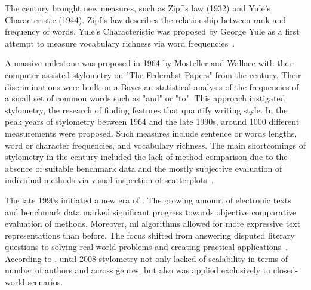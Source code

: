 
The  century brought new measures, such as Zipf's law (1932) and Yule's Characteristic (1944).
Zipf's law describes the relationship between rank and frequency of words.
Yule's Characteristic was proposed by George Yule as a first attempt to measure vocabulary richness via word frequencies~\citep{neal_surveying_2018,stamatatos_survey_2009}.

A massive milestone was proposed in 1964 by Mosteller and Wallace with their computer-assisted stylometry on "The Federalist Papers" from the  century.
Their discriminations were built on a Bayesian statistical analysis of the frequencies of a small set of common words such as "and" or "to".
This approach instigated stylometry, the research of finding features that quantify writing style.
In the peak years of stylometry between 1964 and the late 1990s, around \num{1000} different measurements were proposed.
Such measures include sentence or words lengths, word or character frequencies, and vocabulary richness.
The main shortcomings of stylometry in the  century included the lack of method comparison due to the absence of suitable benchmark data and the mostly subjective evaluation of individual methods via visual inspection of scatterplots~\citep{stamatatos_survey_2009}.

The late 1990s initiated a new era of \ai{}.
The growing amount of electronic texts and benchmark data marked significant progress towards objective comparative evaluation of methods.
Moreover, \ac{ml} algorithms allowed for more expressive text representations than before. 
The focus shifted from answering disputed literary questions to solving real-world problems and creating practical applications~\citep{stamatatos_survey_2009}.
According to \citet{abbasi_writeprints_2008}, until 2008 stylometry not only lacked of scalability in terms of number of authors and across genres, but also was applied exclusively to closed-world scenarios.



